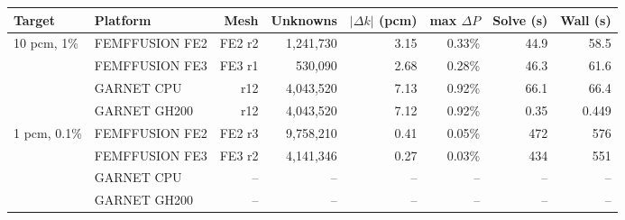 \begin{tabular}{llrrrrrr}
\hline
Target & Platform & Mesh & Unknowns & $|\Delta k|$ (pcm) & max $\Delta P$ & Solve (s) & Wall (s) \\
\hline
10 pcm, 1\% & FEMFFUSION FE2 & FE2 r2 & 1,241,730 & 3.15 & 0.33\% & 44.9 & 58.5 \\
 & FEMFFUSION FE3 & FE3 r1 & 530,090 & 2.68 & 0.28\% & 46.3 & 61.6 \\
 & GARNET CPU & r12 & 4,043,520 & 7.13 & 0.92\% & 66.1 & 66.4 \\
 & GARNET GH200 & r12 & 4,043,520 & 7.12 & 0.92\% & 0.35 & 0.449 \\
\hline
1 pcm, 0.1\% & FEMFFUSION FE2 & FE2 r3 & 9,758,210 & 0.41 & 0.05\% & 472 & 576 \\
 & FEMFFUSION FE3 & FE3 r2 & 4,141,346 & 0.27 & 0.03\% & 434 & 551 \\
 & GARNET CPU & -- & -- & -- & -- & -- & -- \\
 & GARNET GH200 & -- & -- & -- & -- & -- & -- \\
\hline
\end{tabular}
